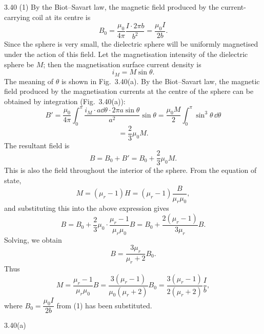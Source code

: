 \begin{solution}{3.40}
(1) By the Biot--Savart law, the magnetic field produced by the current-carrying coil at its centre is
\begin{equation}
B_0=\frac{\mu_0}{4\pi}\frac{I\cdot2\pi b}{b^2}=\frac{\mu_0I}{2b}. \tag{1}
\end{equation}
Since the sphere is very small, the dielectric sphere will be uniformly magnetised under the action of this field. Let the magnetisation intensity of the dielectric sphere be $M$; then the magnetisation surface current density is
\[
i_M=M\sin\theta .
\]
The meaning of $\theta$ is shown in Fig.~3.40(a). By the Biot--Savart law, the magnetic field produced by the magnetisation currents at the centre of the sphere can be obtained by integration (Fig.~3.40(a)):
\[
B'=\frac{\mu_0}{4\pi}\int_0^\pi\frac{i_M\cdot a\dd\theta\cdot2\pi a\sin\theta}{a^2}\sin\theta
=\frac{\mu_0M}{2}\int_0^\pi\sin^3\theta\,\dd\theta
\]
\[
=\frac{2}{3}\mu_0M .
\]
The resultant field is
\[
B=B_0+B'=B_0+\frac{2}{3}\mu_0M .
\]
This is also the field throughout the interior of the sphere. From the equation of state,
\[
M=(\mu_r-1)H=(\mu_r-1)\frac{B}{\mu_r\mu_0},
\]
and substituting this into the above expression gives
\[
B=B_0+\frac{2}{3}\mu_0\cdot\frac{\mu_r-1}{\mu_r\mu_0}B
=B_0+\frac{2(\mu_r-1)}{3\mu_r}B .
\]
Solving, we obtain
\begin{equation}
B=\frac{3\mu_r}{\mu_r+2}B_0 . \tag{2}
\end{equation}
Thus
\begin{equation}
M=\frac{\mu_r-1}{\mu_r\mu_0}B
=\frac{3(\mu_r-1)}{\mu_0(\mu_r+2)}B_0
=\frac{3(\mu_r-1)}{2(\mu_r+2)}\frac{I}{b}, \tag{3}
\end{equation}
where $B_0=\dfrac{\mu_0I}{2b}$ from (1) has been substituted.

\begin{figbox}{3.40(a)}
\end{figbox}


\end{solution}
